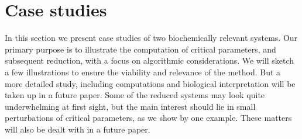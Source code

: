 \documentclass{article}
\begin{document}

\section{Case studies}


In this section we present case studies of two biochemically relevant systems. Our primary purpose is to illustrate the computation of critical parameters, and subsequent reduction, with a focus on algorithmic considerations. We will sketch a few illustrations to ensure the viability and relevance of the method. But a more detailed study, including computations and biological interpretation will be taken up in a future paper. Some of the reduced systems may look quite underwhelming at first sight, but the main interest should lie in small perturbations of critical parameters, as we show by one example. These matters will also be dealt with in a future paper.
\end{document}
